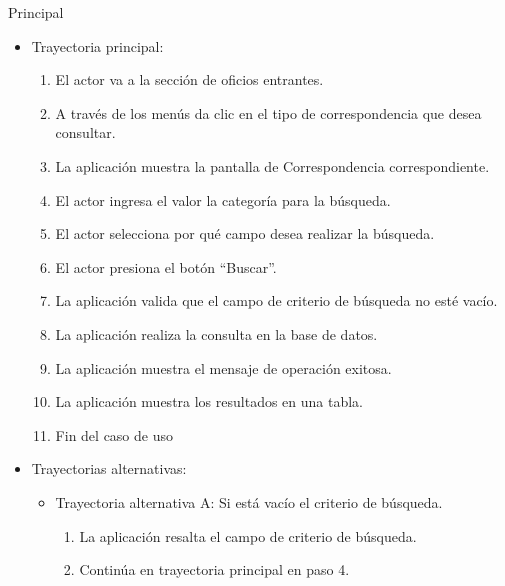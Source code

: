 \begin{UCtrayectoria}{Principal}
\begin{itemize}
	\item Trayectoria principal:
	\begin{enumerate}
		\item	El actor va a la sección de oficios entrantes.
		\item	A través de los menús da clic en el tipo de correspondencia que desea consultar.
		\item	La aplicación muestra la pantalla  de Correspondencia correspondiente.
		\item	El actor ingresa el valor la categoría para la búsqueda.
		\item	El actor selecciona por qué campo desea realizar la búsqueda.
		\item	El actor presiona el botón “Buscar”.
		\item	La aplicación valida que el campo de criterio de búsqueda no esté vacío.
		\item	La aplicación realiza la consulta en la base de datos.
		\item	La aplicación muestra el mensaje  de operación exitosa.
		\item	La aplicación muestra los resultados en una tabla.
		\item	Fin del caso de uso
	\end{enumerate}
	
	\item Trayectorias alternativas:
	\begin{itemize}
		\item Trayectoria alternativa A: Si está vacío el criterio de búsqueda.
			\begin{enumerate}
				\item La aplicación resalta el campo de criterio de búsqueda.
				\item Continúa en trayectoria principal en paso 4.
			\end{enumerate}
	\end{itemize}
\end{itemize}
\newpage

\end{UCtrayectoria}
